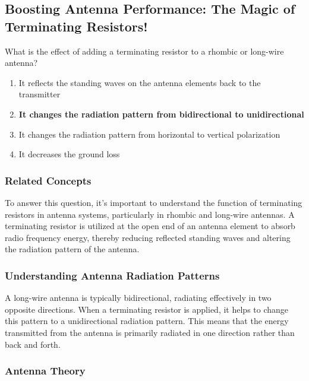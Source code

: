 \subsection{Boosting Antenna Performance: The Magic of Terminating Resistors!}

\begin{tcolorbox}[colback=gray!10, colframe=black, title=E9C06] What is the effect of adding a terminating resistor to a rhombic or long-wire antenna?
\begin{enumerate}[label=\Alph*.]
    \item It reflects the standing waves on the antenna elements back to the transmitter
    \item \textbf{It changes the radiation pattern from bidirectional to unidirectional}
    \item It changes the radiation pattern from horizontal to vertical polarization
    \item It decreases the ground loss
\end{enumerate} \end{tcolorbox}

\subsubsection{Related Concepts}

To answer this question, it's important to understand the function of terminating resistors in antenna systems, particularly in rhombic and long-wire antennas. A terminating resistor is utilized at the open end of an antenna element to absorb radio frequency energy, thereby reducing reflected standing waves and altering the radiation pattern of the antenna.

\subsubsection{Understanding Antenna Radiation Patterns}

A long-wire antenna is typically bidirectional, radiating effectively in two opposite directions. When a terminating resistor is applied, it helps to change this pattern to a unidirectional radiation pattern. This means that the energy transmitted from the antenna is primarily radiated in one direction rather than back and forth.

\subsubsection{Antenna Theory}

